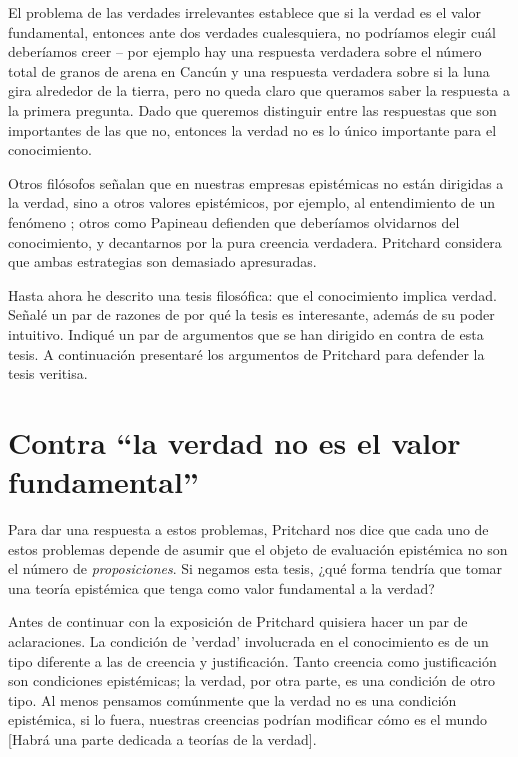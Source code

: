 \documentclass{article}
\begin{document}
El problema de las verdades irrelevantes establece que si la verdad es el valor fundamental, entonces ante dos verdades cualesquiera, no podríamos elegir cuál deberíamos creer -- por ejemplo hay una respuesta verdadera sobre el número total de granos de arena en Cancún y una respuesta verdadera sobre si la luna gira alrededor de la tierra, pero no queda claro que queramos saber la respuesta a la primera pregunta. Dado que queremos distinguir entre las respuestas que son importantes de las que no, entonces la verdad no es lo único importante para el conocimiento. 

Otros filósofos señalan que en nuestras empresas epistémicas no están dirigidas a la verdad, sino a otros valores epistémicos, por ejemplo, al entendimiento de un fenómeno \cite{Elgin2004}; otros como Papineau \citeyear{Papineau2021} defienden que deberíamos olvidarnos del conocimiento, y decantarnos por la pura creencia verdadera. Pritchard considera que ambas estrategias son demasiado apresuradas.

Hasta ahora he descrito una tesis filosófica: que el conocimiento implica verdad. Señalé un par de razones de por qué la tesis es interesante, además de su poder intuitivo. Indiqué un par de argumentos que se han dirigido en contra de esta tesis. A continuación presentaré los argumentos de Pritchard para defender la tesis veritisa.

\section{Contra ``la verdad no es el valor fundamental''}

\noindent Para dar una respuesta a estos problemas, Pritchard nos dice que cada uno de estos problemas depende de asumir que el objeto de evaluación epistémica no son el número de \textit{proposiciones}. Si negamos esta tesis, ¿qué forma tendría que tomar una teoría epistémica que tenga como valor fundamental a la verdad?

Antes de continuar con la exposición de Pritchard quisiera hacer un par de aclaraciones. La condición de 'verdad' involucrada en el conocimiento es de un tipo diferente a las de creencia y justificación. Tanto creencia como justificación son condiciones epistémicas; la verdad, por otra parte, es una condición de otro tipo. Al menos pensamos comúnmente que la verdad no es una condición epistémica, si lo fuera, nuestras creencias podrían modificar cómo es el mundo [Habrá una parte dedicada a teorías de la verdad]. 
\end{document}
